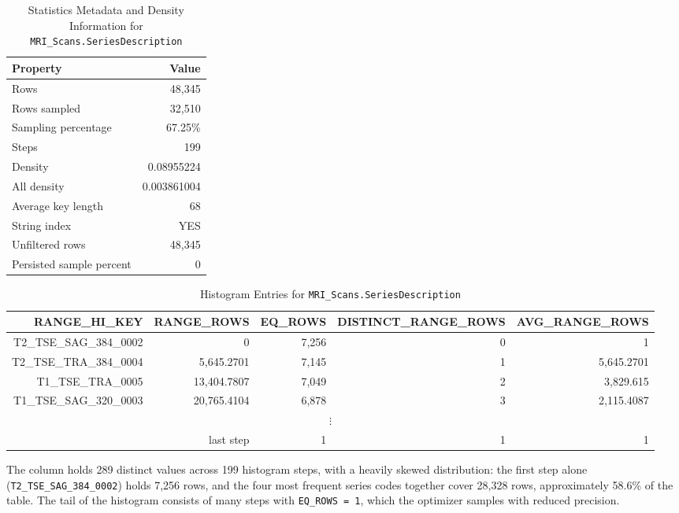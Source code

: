 \begin{table}[htbp]
\centering
\caption{Statistics Metadata and Density Information for \texttt{MRI\_Scans.SeriesDescription}}
\label{tab:q2-statistics}
\begin{tabular}{lr}
\toprule
Property & Value \\
\midrule
Rows & 48,345 \\
Rows sampled & 32,510 \\
Sampling percentage & 67.25\% \\
Steps & 199 \\
Density & 0.08955224 \\
All density & 0.003861004 \\
Average key length & 68 \\
String index & YES \\
Unfiltered rows & 48,345 \\
Persisted sample percent & 0 \\
\bottomrule
\end{tabular}
\end{table}

\begin{table}[htbp]
\centering
\small
\caption{Histogram Entries for \texttt{MRI\_Scans.SeriesDescription}}
\label{tab:q2_seriesdescription_histogram}
\begin{tabular}{|r|r|r|r|r|}
\hline
RANGE\_HI\_KEY & RANGE\_ROWS & EQ\_ROWS &
DISTINCT\_RANGE\_ROWS & AVG\_RANGE\_ROWS \\
\hline
T2\_TSE\_SAG\_384\_0002  & 0        & 7,256 & 0   & 1 \\
\hline
T2\_TSE\_TRA\_384\_0004  & 5,645.2701 & 7,145 & 1 & 5,645.2701 \\
\hline
T1\_TSE\_TRA\_0005       & 13,404.7807 & 7,049 & 2 & 3,829.615 \\
\hline
T1\_TSE\_SAG\_320\_0003  & 20,765.4104 & 6,878 & 3 & 2,115.4087 \\
\hline
\multicolumn{5}{|c|}{$\vdots$} \\
\hline
\multicolumn{2}{|r|}{last step} & 1 & 1 & 1 \\
\hline
\end{tabular}
\end{table}

The column holds 289 distinct values across 199 histogram steps, with a heavily skewed distribution: the first step alone (\texttt{T2\_TSE\_SAG\_384\_0002}) holds 7,256 rows, and the four most frequent series codes together cover 28,328 rows, approximately 58.6\% of the table. The tail of the histogram consists of many steps with \texttt{EQ\_ROWS = 1}, which the optimizer samples with reduced precision.

